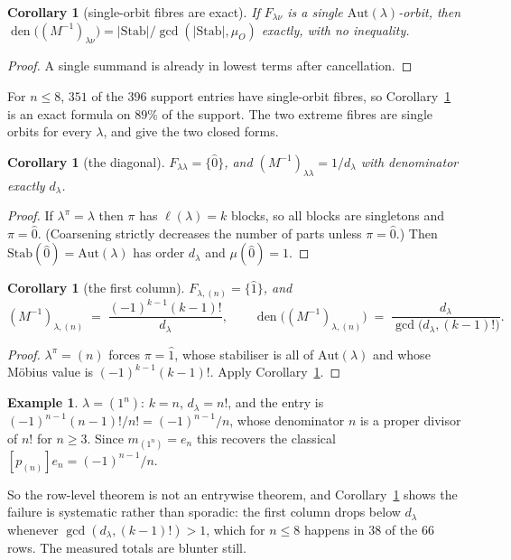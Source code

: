 \documentclass[11pt]{article}
\newtheorem{corollary}[theorem]{Corollary}
\theoremstyle{definition}
\newtheorem{example}[theorem]{Example}
\newcommand{\lam}{\lambda}
\newcommand{\Stab}{\mathrm{Stab}}
\newcommand{\Aut}{\mathrm{Aut}}
\newcommand{\htz}{\hat 0}
\newcommand{\hto}{\hat 1}
\DeclareMathOperator{\den}{den}
\begin{document}
\begin{corollary}[single-orbit fibres are exact]\label{cor:single}
If $F_{\lam\nu}$ is a single $\Aut(\lam)$-orbit, then
$\den\bigl((M^{-1})_{\lam\nu}\bigr)=|\Stab|/\gcd(|\Stab|,\mu_O)$ exactly, with no inequality.
\end{corollary}

\begin{proof}
A single summand is already in lowest terms after cancellation.
\end{proof}

For $n\le8$, $351$ of the $396$ support entries have single-orbit fibres, so
Corollary~\ref{cor:single} is an exact formula on $89\%$ of the support. The two extreme fibres are
single orbits for every $\lam$, and give the two closed forms.

\begin{corollary}[the diagonal]\label{cor:diag}
$F_{\lam\lam}=\{\htz\}$, and $(M^{-1})_{\lam\lam}=1/d_\lam$ with denominator exactly $d_\lam$.
\end{corollary}

\begin{proof}
If $\lam^\pi=\lam$ then $\pi$ has $\ell(\lam)=k$ blocks, so all blocks are singletons and
$\pi=\htz$. (Coarsening strictly decreases the number of parts unless $\pi=\htz$.) Then
$\Stab(\htz)=\Aut(\lam)$ has order $d_\lam$ and $\mu(\htz)=1$.
\end{proof}

\begin{corollary}[the first column]\label{cor:first}
$F_{\lam,(n)}=\{\hto\}$, and
\[
  (M^{-1})_{\lam,(n)}\;=\;\frac{(-1)^{k-1}(k-1)!}{d_\lam},
  \qquad
  \den\bigl((M^{-1})_{\lam,(n)}\bigr)\;=\;\frac{d_\lam}{\gcd\bigl(d_\lam,(k-1)!\bigr)} .
\]
\end{corollary}

\begin{proof}
$\lam^\pi=(n)$ forces $\pi=\hto$, whose stabiliser is all of $\Aut(\lam)$ and whose Möbius value is
$(-1)^{k-1}(k-1)!$. Apply Corollary~\ref{cor:single}.
\end{proof}

\begin{example}
$\lam=(1^n)$: $k=n$, $d_\lam=n!$, and the entry is $(-1)^{n-1}(n-1)!/n!=(-1)^{n-1}/n$, whose
denominator $n$ is a proper divisor of $n!$ for $n\ge3$. Since $m_{(1^n)}=e_n$ this recovers the
classical $[p_{(n)}]e_n=(-1)^{n-1}/n$.
\end{example}

So the row-level theorem is not an entrywise theorem, and Corollary~\ref{cor:first} shows the failure
is systematic rather than sporadic: the first column drops below $d_\lam$ whenever
$\gcd(d_\lam,(k-1)!)>1$, which for $n\le8$ happens in $38$ of the $66$ rows. The measured totals are
blunter still.
\end{document}
